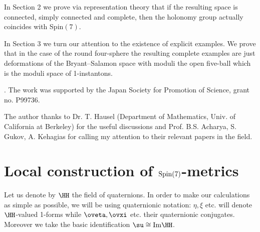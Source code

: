 \documentclass[a4paper,12pt,draft]{article}
\begin{document}
In Section 2 we prove via representation theory that if the resulting
space is connected, simply connected and complete, then the holonomy group
actually coincides with Spin$(7)$.

In Section 3 we turn our attention to the existence of explicit 
examples. We prove that in the case of the round four-sphere the
resulting complete examples are just deformations of the
Bryant--Salamon space \cite{bry-sal}\cite{gib-pag-pop} with moduli the
open five-ball which is the moduli space of 1-instantons. 
\vspace{0.1in}

. The work was supported by the Japan
Society for Promotion of Science, grant no. P99736.

The author thanks to Dr. T. Hausel (Department of Mathematics,
Univ. of California at Berkeley) for the useful discussions and Prof.
B.S. Acharya, S. Gukov, A. Kehagias for calling my attention to their
relevant papers in the field.

\section{Local construction of ${\rm Spin}(7)$-metrics}
Let us denote by $\HH$ the field of quaternions. In order to make our
calculations as simple as possible, we will be using quaternionic
notation: $\eta ,\xi$ etc. will denote $\HH$-valued 1-forms while $\oveta
,\ovxi$ etc. their quaternionic conjugates. Moreover we take the basic
identification $\su\cong{\rm Im}\HH$.
\end{document}
